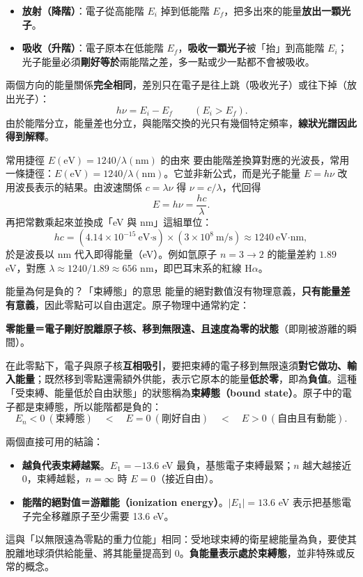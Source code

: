 \documentclass[11pt]{article}
\begin{document}
\begin{itemize}\setlength{\itemsep}{2pt}
\item \textbf{放射（降階）}：電子從高能階 $E_i$ 掉到低能階 $E_f$，把多出來的能量\textbf{放出一顆光子}。
\item \textbf{吸收（升階）}：電子原本在低能階 $E_f$，\textbf{吸收一顆光子}被「抬」到高能階 $E_i$；光子能量必須\textbf{剛好等於}兩能階之差，多一點或少一點都不會被吸收。
\end{itemize}
兩個方向的能量關係\textbf{完全相同}，差別只在電子是往上跳（吸收光子）或往下掉（放出光子）：
$$\boxed{\,h\nu = E_i - E_f\,}\qquad(E_i>E_f).$$
由於能階分立，能量差也分立，與能階交換的光只有幾個特定頻率，\textbf{線狀光譜因此得到解釋}。

\begin{補充框}{常用捷徑 $E(\text{eV})=1240/\lambda(\text{nm})$ 的由來}
要由能階差換算對應的光波長，常用一條捷徑：$E(\text{eV})=1240/\lambda(\text{nm})$。它並非新公式，而是光子能量 $E=h\nu$ 改用波長表示的結果。由波速關係 $c=\lambda\nu$ 得 $\nu=c/\lambda$，代回得
$$E=h\nu=\frac{hc}{\lambda}.$$
再把常數乘起來並換成「eV 與 nm」這組單位：
$$hc=(4.14\times10^{-15}\ \text{eV·s})\times(3\times10^{8}\ \text{m/s})\approx1240\ \text{eV·nm},$$
於是波長以 nm 代入即得能量（eV）。例如氫原子 $n=3\rightarrow2$ 的能量差約 $1.89$ eV，對應 $\lambda\approx1240/1.89\approx656$ nm，即巴耳末系的紅線 H$\alpha$。
\end{補充框}

\begin{補充框}{能量為何是負的？「束縛態」的意思}
能量的絕對數值沒有物理意義，\textbf{只有能量差有意義}，因此零點可以自由選定。原子物理中通常約定：

\textbf{零能量＝電子剛好脫離原子核、移到無限遠、且速度為零的狀態}（即剛被游離的瞬間）。

在此零點下，電子與原子核\textbf{互相吸引}，要把束縛的電子移到無限遠須\textbf{對它做功、輸入能量}；既然移到零點還需額外供能，表示它原本的能量\textbf{低於零}，即為\textbf{負值}。這種「受束縛、能量低於自由狀態」的狀態稱為\textbf{束縛態（bound state）}。原子中的電子都是束縛態，所以能階都是負的：
$$E_n<0\ (\text{束縛態}) \quad<\quad E=0\ (\text{剛好自由}) \quad<\quad E>0\ (\text{自由且有動能}).$$

兩個直接可用的結論：
\begin{itemize}\setlength{\itemsep}{1pt}
\item \textbf{越負代表束縛越緊}。$E_1=-13.6$ eV 最負，基態電子束縛最緊；$n$ 越大越接近 0，束縛越鬆，$n=\infty$ 時 $E=0$（接近自由）。
\item \textbf{能階的絕對值＝游離能（ionization energy）}。$|E_1|=13.6$ eV 表示把基態電子完全移離原子至少需要 13.6 eV。
\end{itemize}
這與「以無限遠為零點的重力位能」相同：受地球束縛的衛星總能量為負，要使其脫離地球須供給能量、將其能量提高到 0。\textbf{負能量表示處於束縛態}，並非特殊或反常的概念。
\end{補充框}
\end{document}

